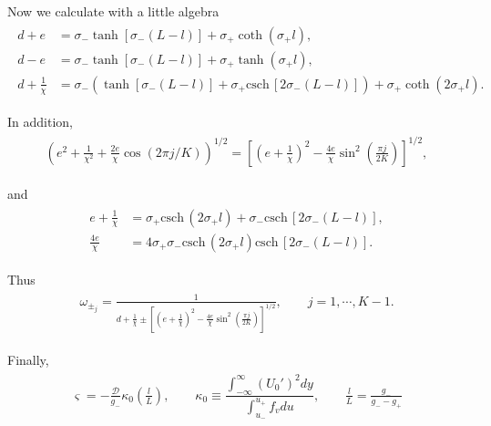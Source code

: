 \documentclass[a4paper,10pt]{article}
\newcommand{\sI}{\ensuremath{\sigma}}
\newcommand{\vA}{\ensuremath{\varsigma}}
\newcommand{\kA}{\ensuremath{\kappa}}
\newcommand{\DD}{\ensuremath{\mathcal{D}}}
\newcommand{\csch}{\mathrm{csch} \,}
\begin{document}
Now we calculate with a little algebra
% 
\begin{equation*}
	\begin{split}
	\begin{aligned}
	  d + e&= \sI_-\tanh[\sI_-(L-l)]+\sI_+\coth(\sI_+l),\\
	  d - e&= \sI_-\tanh[\sI_-(L-l)]+\sI_+\tanh(\sI_+l),\\
	  d + \frac{1}{\chi} &= \sI_-(\tanh[\sI_-(L-l)]+\sI_+\csch[2\sI_-(L-l)]) + \sI_+\coth(2\sI_+l).
	\end{aligned}
	\end{split}
\end{equation*}
%

In addition,
% 
\begin{equation*}
	\begin{split}
	\begin{aligned}
	  \left(e^2 + \frac{1}{\chi^2} + \frac{2e}{\chi}\cos(2\pi j/K) \right)^{1/2} = \left[\left(e + \frac{1}{\chi}\right)^2 - \frac{4e}{\chi}\sin^2\left(\frac{\pi j}{2K}\right) \right]^{1/2},
	\end{aligned}
	\end{split}
\end{equation*}
%

and
% 
\begin{equation*}
	\begin{split}
	\begin{aligned}
	  e+\frac{1}{\chi} &= \sI_+\csch(2\sI_+l) + \sI_-\csch[2\sI_-(L-l)],\\
	  \frac{4e}{\chi} &= 4\sI_+\sI_-\csch(2\sI_+l)\csch[2\sI_-(L-l)].
	\end{aligned}
	\end{split}
\end{equation*}
%

Thus
% 
\begin{equation*}
	\begin{split}
	\begin{aligned}
	  \omega_{\pm_j} = \frac{1}{d+\frac{1}{\chi}\pm \left[\left(e + \frac{1}{\chi}\right)^2 - \frac{4e}{\chi}\sin^2\left(\frac{\pi j}{2K}\right) \right]^{1/2}},\qquad j=1,\cdots,K-1.
	\end{aligned}
	\end{split}
\end{equation*}
%

Finally,
% 
\begin{equation*}
	\begin{split}
	\begin{aligned}
	  \vA = -\frac{\DD}{g_-}\kA_0\left(\frac{l}{L} \right),\qquad \kA_0\equiv\dfrac{\int_{-\infty}^{\infty}(U_0')^2 dy}{\int_{u_-}^{u_+}f_vdu},\qquad \frac{l}{L} = \frac{g_-}{g_--g_+} 
	\end{aligned}
	\end{split}
\end{equation*}
%




\end{document}
